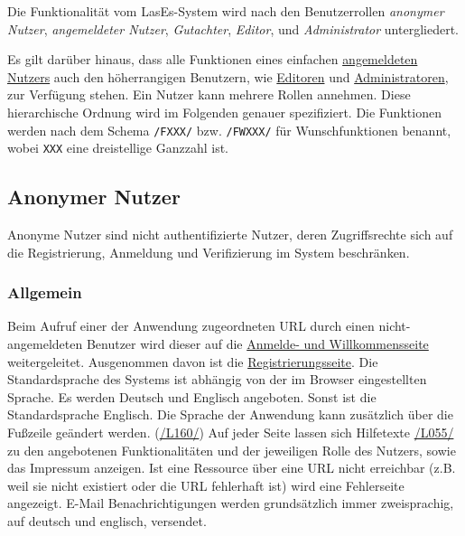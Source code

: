 

Die Funktionalität vom LasEs-System wird nach den Benutzerrollen
\textit{anonymer Nutzer}, \textit{angemeldeter Nutzer}, \textit{Gutachter}, \textit{Editor}, und
\textit{Administrator} untergliedert.

Es gilt darüber hinaus, dass alle Funktionen eines einfachen \hyperref[glo:regnutzer]{angemeldeten Nutzers} auch den höherrangigen Benutzern, wie
\hyperref[glo:editor]{Editoren} und \hyperref[glo:admin]{Administratoren}, zur Verfügung stehen. Ein Nutzer kann mehrere Rollen annehmen.
Diese hierarchische Ordnung wird im Folgenden genauer spezifiziert.
Die Funktionen werden nach dem Schema \texttt{/FXXX/} bzw. \texttt{/FWXXX/} für Wunschfunktionen benannt, wobei \texttt{XXX} eine dreistellige Ganzzahl ist.

\subsection{Anonymer Nutzer}\label{funkt:nutzer}
Anonyme Nutzer sind nicht authentifizierte Nutzer, deren Zugriffsrechte sich
auf die Registrierung, Anmeldung und Verifizierung im System beschränken.

\subsubsection{Allgemein}
\begin{description}
     Beim Aufruf einer der Anwendung zugeordneten URL durch einen nicht-angemeldeten Benutzer
    wird dieser auf die \hyperref[an:log]{Anmelde- und Willkommensseite} weitergeleitet. Ausgenommen davon ist die \hyperref[an:reg]{Registrierungsseite}.
     Die Standardsprache des Systems ist abhängig von der im Browser
    eingestellten Sprache. Es werden Deutsch und Englisch angeboten.
    Sonst ist die Standardsprache Englisch. Die Sprache der Anwendung kann zusätzlich über die
    Fußzeile geändert werden. (\hyperref[leist:160]{/L160/})
     Auf jeder Seite lassen sich
    Hilfetexte \hyperref[leist:055]{/L055/} zu den angebotenen Funktionalitäten und der jeweiligen Rolle
    des Nutzers, sowie das Impressum anzeigen.
     Ist eine Ressource über eine URL nicht erreichbar (z.B. weil sie nicht existiert oder
     die URL fehlerhaft ist) wird eine Fehlerseite angezeigt.
     E-Mail Benachrichtigungen werden grundsätzlich immer zweisprachig,
    auf deutsch und englisch, versendet.
\end{description}

